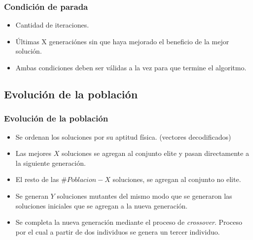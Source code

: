 \documentclass{beamer}
\begin{document}
\begin{frame}
\frametitle{Condición de parada}

\begin{itemize}
    \item Cantidad de iteraciones.
    \pause
    \item \'Ultimas X generaciónes sin que haya mejorado el beneficio de la mejor solución.
    \pause
    \item Ambas condiciones deben ser válidas a la vez para que termine el algoritmo.
\end{itemize}

\end{frame}


\subsection{Evolución de la población}

\begin{frame}
\frametitle{Evolución de la población}

\begin{itemize}
    \item Se ordenan los soluciones por su aptitud física. (vectores decodificados)
    \pause
    \item Las mejores $X$ soluciones se agregan al conjunto elite y pasan directamente a la siguiente generación.
    \pause
    \item El resto de las $\#Poblacion-X$ soluciones, se agregan al conjunto no elite.
    \pause
    \item Se generan $Y$ soluciones mutantes del mismo modo que se generaron las soluciones iniciales que se agregan a la nueva generación.
    \pause
    \item Se completa la nueva generación mediante el proceso de \textit{crossover}. Proceso por el cual a partir de dos individuos se genera un tercer individuo.
\end{itemize}

\end{frame}

\end{document}
